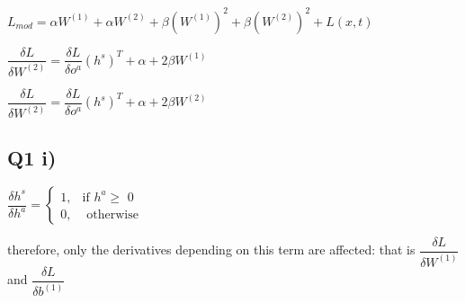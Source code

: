 \documentclass{article}
\begin{document}
    $L_{mod} = \alpha W^{(1)} + \alpha W^{(2)} + \beta (W^{(1)})^2 + \beta (W^{(2)})^2 +L(x, t)$

$\dfrac {\delta  L} {\delta W^{(2)}} = \dfrac {\delta L} {\delta o^a} (h^s)^T +\alpha + 2\beta W^{(1)}  $

$\dfrac {\delta L} {\delta W^{(2)}} =  \dfrac {\delta L} {\delta o^a} (h^s)^T +\alpha + 2\beta W^{(2)}  $

    \subsection{Q1 i)}\label{q1-i}

    $\dfrac {\delta h^s} {\delta h^a} = \begin{cases} 1, & \text{if }h^a\geq\text{ 0} \\ 0, & \text{ otherwise} \end{cases}$

therefore, only the derivatives depending on this term are affected:
that is $\dfrac {\delta L} {\delta W^{(1)}}$ and
$\dfrac {\delta L} {\delta b^{(1)}}$


    
    
    
    
\end{document}
